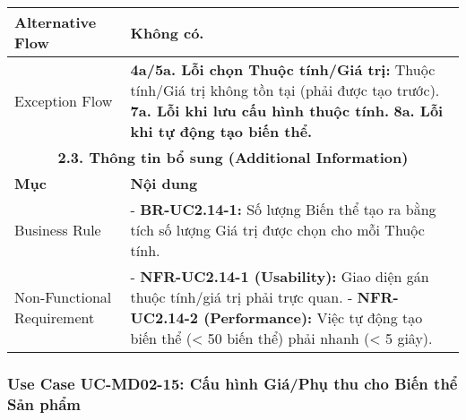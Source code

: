 \begin{longtable}{|m{4cm}|p{11cm}|}
\hline
Alternative Flow & Không có. \\
\hline
Exception Flow & \textbf{4a/5a. Lỗi chọn Thuộc tính/Giá trị:} Thuộc tính/Giá trị không tồn tại (phải được tạo trước). \newline \textbf{7a. Lỗi khi lưu cấu hình thuộc tính.} \newline \textbf{8a. Lỗi khi tự động tạo biến thể.} \\
\hline
\multicolumn{2}{|c|}{\textbf{2.3. Thông tin bổ sung (Additional Information)}} \\
\hline
\textbf{Mục} & \textbf{Nội dung} \\
\hline
Business Rule & - \textbf{BR-UC2.14-1:} Số lượng Biến thể tạo ra bằng tích số lượng Giá trị được chọn cho mỗi Thuộc tính. \\
\hline
Non-Functional Requirement & - \textbf{NFR-UC2.14-1 (Usability):} Giao diện gán thuộc tính/giá trị phải trực quan. \newline - \textbf{NFR-UC2.14-2 (Performance):} Việc tự động tạo biến thể (< 50 biến thể) phải nhanh (< 5 giây). \\
\hline
\end{longtable}

\subsubsection{Use Case UC-MD02-15: Cấu hình Giá/Phụ thu cho Biến thể Sản phẩm}

